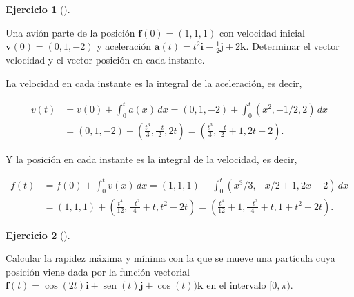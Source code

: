 \documentclass[
  a4paper,
]{scrreport}
\theoremstyle{definition}
\newtheorem{exercise}{Ejercicio}[chapter]
\theoremstyle{remark}
\begin{document}
\begin{exercise}[]\protect\hypertarget{exr-cinematica-avion}{}\label{exr-cinematica-avion}

Una avión parte de la posición \(\mathbf{f}(0)=(1, 1, 1)\) con velocidad
inicial \(\mathbf{v}(0)=(0,1,-2)\) y aceleración
\(\mathbf{a}(t)=t^2\mathbf{i}-\frac{1}{2}\mathbf{j}+2\mathbf{k}\).
Determinar el vector velocidad y el vector posición en cada instante.

\end{exercise}

\begin{tcolorbox}[enhanced jigsaw, coltitle=black, toptitle=1mm, colframe=quarto-callout-tip-color-frame, colbacktitle=quarto-callout-tip-color!10!white, breakable, opacityback=0, bottomtitle=1mm, opacitybacktitle=0.6, title=\textcolor{quarto-callout-tip-color}{\faLightbulb}\hspace{0.5em}{Solución}, arc=.35mm, leftrule=.75mm, toprule=.15mm, titlerule=0mm, bottomrule=.15mm, left=2mm, rightrule=.15mm, colback=white]

La velocidad en cada instante es la integral de la aceleración, es
decir,

\begin{align*}
v(t) 
&= v(0) + \int_0^t a(x)\,dx 
= (0,1,-2) + \int_0^t (x^2,-1/2,2)\,dx \\
&= (0,1,-2) + (\frac{t^3}{3},\frac{-t}{2},2t) 
= \left(\frac{t^3}{3},\frac{-t}{2}+1,2t-2\right).
\end{align*}

Y la posición en cada instante es la integral de la velocidad, es decir,

\begin{align*}
f(t) 
&= f(0) + \int_0^t v(x)\,dx 
= (1,1,1) + \int_0^t (x^3/3,-x/2+1,2x-2)\,dx \\
&= (1,1,1) + (\frac{t^4}{12},\frac{-t^2}{4}+t, t^2-2t)
= \left(\frac{t^4}{12}+1,\frac{-t^2}{4}+t,1+t^2-2t\right).
\end{align*}

\end{tcolorbox}

\begin{exercise}[]\protect\hypertarget{exr-cinematica}{}\label{exr-cinematica}

Calcular la rapidez máxima y mínima con la que se mueve una partícula
cuya posición viene dada por la función vectorial
\(\mathbf{f}(t) = \cos(2t)\mathbf{i} + \operatorname{sen}(t)\mathbf{j} + \cos(t))\mathbf{k}\)
en el intervalo \([0,\pi)\).

\end{exercise}
\end{document}
